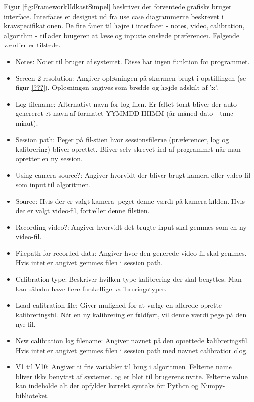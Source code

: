 \documentclass[rapport.tex]{subfiles}
\begin{document}
	Figur \ref{fig:FrameworkUdkastSimpel} beskriver det forventede grafiske bruger interface. Interfaces er designet ud fra use case diagrammerne beskrevet i kravspecifikationen.
	De fire faner til højre i interfacet - notes, video, calibration, algorithm - tillader brugeren at læse og inputte ønskede præferencer. Følgende værdier er tilstede:
	\begin{itemize}
		\item Notes: Noter til bruger af systemet. Disse har ingen funktion for programmet.
		\item Screen 2 resolution: Angiver opløsningen på skærmen brugt i opstillingen (se figur \ref{???}). Opløsningen angives som bredde og højde adskilt af 'x'.
		\item Log filename: Alternativt navn for log-filen. Er feltet tomt bliver der auto-genereret et navn af formatet YYMMDD-HHMM (år måned dato - time minut). 
		\item Session path: Peger på fil-stien hvor sessionsfilerne (præferencer, log og kalibrering) bliver oprettet. Bliver selv skrevet ind af programmet når  man opretter en ny session. 
		\item Using camera source?: Angiver hvorvidt der bliver brugt kamera eller video-fil som input til algoritmen. 
		\item Source: Hvis der er valgt kamera, peget denne værdi på kamera-kilden. Hvis der er valgt video-fil, fortæller denne filstien. 
		\item Recording video?: Angiver hvorvidt det brugte input skal gemmes som en ny video-fil. 
		\item Filepath for recorded data: Angiver hvor den generede video-fil skal gemmes. Hvis intet er angivet gemmes filen i session path. 
		\item Calibration type: Beskriver hvilken type kalibrering der skal benyttes. Man kan således have flere forskellige kalibreringstyper. 
		\item Load calibration file: Giver mulighed for at vælge en allerede oprette kalibreringsfil. Når en ny kalibrering er fuldført, vil denne værdi pege på den nye fil.
		\item New calibration log filename: Angiver navnet på den oprettede kalibreringsfil. Hvis intet er angivet gemmes filen i session path med navnet calibration.clog. 
		\item V1 til V10: Angiver ti frie variabler til brug i algoritmen. Felterne name bliver ikke benyttet af systemet, og er blot til brugerens nytte. Felterne value kan indeholde alt der opfylder korrekt syntaks for Python og Numpy-biblioteket. 
	\end{itemize}		
\end{document}

